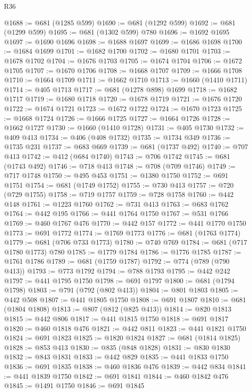 \begin{lexlean}{R36}
\begin{coremodule}
@1688 := @681 (@1285 @599)
@1690 := @681 (@1292 @599)
@1692 := @681 (@1299 @599)
@1695 := @681 (@1302 @599) @780
@1696 := @1692 @1695
@1697 := @1690 @1696
@1698 := @1688 @1697
@1699 := @1686 @1698
@1700 := @1684 @1699
@1701 := @1682 @1700
@1702 := @1680 @1701
@1703 := @1678 @1702
@1704 := @1676 @1703
@1705 := @1674 @1704
@1706 := @1672 @1705
@1707 := @1670 @1706
@1708 := @1668 @1707
@1709 := @1666 @1708
@1710 := @1664 @1709
@1711 := @1662 @1710
@1713 := @1660 (@1410 @1711)
@1714 := @405 @1713
@1717 := @681 (@1278 @898) @1699
@1718 := @1682 @1717
@1719 := @1680 @1718
@1720 := @1678 @1719
@1721 := @1676 @1720
@1722 := @1674 @1721
@1723 := @1672 @1722
@1724 := @1670 @1723
@1725 := @1668 @1724
@1726 := @1666 @1725
@1727 := @1664 @1726
@1728 := @1662 @1727
@1730 := @1660 (@1410 @1728)
@1731 := @405 @1730
@1732 := @409 @413
@1734 := @406 (@408 @1732)
@1735 := @1734 @349
@1736 := @1735 @231
@1737 := @683 @669
@1739 := @681 (@1737 @492)
@1740 := @707 @413
@1742 := @412 (@684 @1740)
@1743 := @706 @1742
@1745 := @681 (@1743 @492)
@1746 := @718 @413
@1748 := @708 (@709 @1746)
@1749 := @717 @1748
@1750 := @495 @453
@1751 := @1380 @1750
@1752 := @691 @1751
@1754 := @681 (@1749 @1752)
@1755 := @730 @413
@1757 := @720 (@729 @1755)
@1758 := @719 @1757
@1759 := @728 @1758
@1760 := @442 @148
@1761 := @1223 @1760
@1762 := @731 @413
@1763 := @683 @1762
@1764 := @442 @195
@1766 := @441 @1764 @1750
@1767 := @531 @1766
@1769 := @460 @1767 @476
@1770 := @442 @157
@1772 := @441 @1770 @1750
@1773 := @691 @1772
@1774 := @1769 @1773
@1776 := @681 (@1763 @1774)
@1779 := @681 (@706 @733 @1773)
@1780 := @740 @769
@1784 := @681 (@717 @1780 @1773) @780
@1785 := @1779 @1784
@1786 := @1776 @1785
@1787 := @1761 @1786
@1789 := @681 (@1759 @1787)
@1792 := @774 (@789 (@790 @413))
@1793 := @773 @1792
@1794 := @788 @1793
@1795 := @442 @242
@1797 := @441 @1795 @1750
@1798 := @691 @1797
@1800 := @681 (@1794 @1798)
@1803 := @791 (@792 (@802 @413))
@1804 := @801 @1803
@1805 := @442 @508
@1807 := @441 @1805 @1750
@1808 := @691 @1807
@1810 := @681 (@1804 @1808)
@1813 := @807 (@812 (@825 @413))
@1814 := @820 @1813
@1815 := @442 @806
@1817 := @441 @1815 @1750
@1818 := @691 @1817
@1820 := @460 @1818 @476
@1821 := @442 @811
@1823 := @441 @1821 @1750
@1824 := @691 @1823
@1825 := @1820 @1824
@1827 := @681 (@1814 @1825)
@1828 := @853 @413
@1830 := @835 (@848 @1828)
@1831 := @830 @1830
@1832 := @843 @1831
@1833 := @442 @829
@1835 := @441 @1833 @1750
@1836 := @691 @1835
@1838 := @460 @1836 @476
@1839 := @442 @834
@1841 := @441 @1839 @1750
@1842 := @691 @1841
@1844 := @460 @1842 @476
@1845 := @1491 @1750
@1846 := @691 @1845

\end{coremodule}
\end{lexlean}
